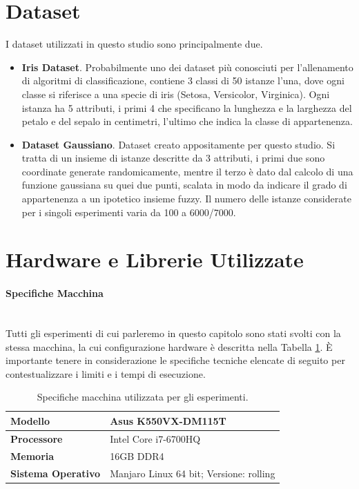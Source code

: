 \documentclass[a4paper,12pt]{report}
\begin{document}
\section{Dataset}
I dataset utilizzati in questo studio sono principalmente due.
\begin{itemize}
    \item \textbf{Iris Dataset}. Probabilmente uno dei dataset più conosciuti per l'allenamento di algoritmi di classificazione, contiene 3 classi di 50 istanze l'una, dove ogni classe si riferisce a una specie di iris (Setosa, Versicolor, Virginica). Ogni istanza ha 5 attributi, i primi 4 che specificano la lunghezza e la larghezza del petalo e del sepalo in centimetri, l'ultimo che indica la classe di appartenenza. 
    \item \textbf{Dataset Gaussiano}. Dataset creato appositamente per questo studio. Si tratta di un insieme di istanze descritte da 3 attributi, i primi due sono coordinate generate randomicamente, mentre il terzo è dato dal calcolo di una funzione gaussiana su quei due punti, scalata in modo da indicare il grado di appartenenza a un ipotetico insieme fuzzy. Il numero delle istanze considerate per i singoli esperimenti varia da 100 a 6000/7000.
\end{itemize}

\section{Hardware e Librerie Utilizzate}
\paragraph{Specifiche Macchina}\mbox{}\\
Tutti gli esperimenti di cui parleremo in questo capitolo sono stati svolti con la stessa macchina, la cui configurazione hardware è descritta nella Tabella \ref{tab:specifiche_macchina}. \`E importante tenere in considerazione le specifiche tecniche elencate di seguito per contestualizzare i limiti e i tempi di esecuzione. 
\smallskip

\begin{table}[H]
\centering
\begin{tabular}{|l|l|}
    \hline 
    \textbf{Modello} & Asus K550VX-DM115T \\
    \hline
    \textbf{Processore} & Intel Core i7-6700HQ \\
    \hline
    \textbf{Memoria} & 16GB DDR4 \\
    \hline
    \textbf{Sistema Operativo} & Manjaro Linux 64 bit; Versione: rolling \\
    \hline
\end{tabular}
\caption{Specifiche macchina utilizzata per gli esperimenti.}
\label{tab:specifiche_macchina}
\end{table}
\end{document}
